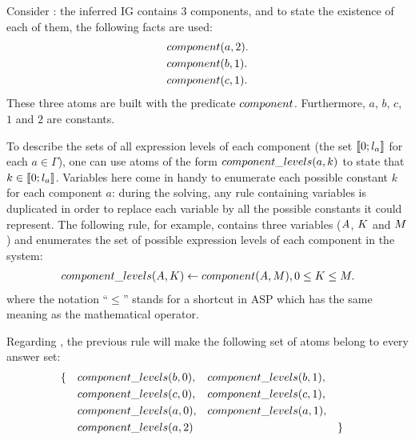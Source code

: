 \begin{example}
Consider : the inferred IG contains 3 components, and to state the existence of each of them, the following facts are used:
\begin{align*}
  &component(a, 2). \\
  &component(b, 1). \\
  &component(c, 1).
\end{align*}
These three atoms are built with the predicate $component$.
Furthermore, $a$, $b$, $c$, $1$ and $2$ are constants.
\end{example}

To describe the sets of all expression levels of each component (\ie the set $\llbracket 0 ; l_a \rrbracket$ for each $a \in \Gamma$),
one can use atoms of the form $component\_levels(a, k)$ to state that $k \in \llbracket 0 ; l_a \rrbracket$.
Variables here come in handy to enumerate each possible constant $k$ for each component $a$:
during the solving, any rule containing variables is duplicated in order to replace each variable by all the possible constants it could represent.
The following rule, for example, contains three variables ($A$, $K$ and $M$) and enumerates the set of possible expression levels of each component in the system:
\begin{align*}
  component\_levels(A, K) \leftarrow component(A, M), 0 \leq K \leq M.
\end{align*}
where the notation “$\leq$” stands for a shortcut in ASP which has the same meaning as the mathematical operator.

\begin{example}
Regarding , the previous rule will make the following set of atoms belong to every answer set:
\begin{align*}
  &\{&&component\_levels(b, 0),
  &&component\_levels(b, 1), \\
  &&&component\_levels(c, 0),
  &&component\_levels(c, 1), \\
  &&&component\_levels(a, 0),
  &&component\_levels(a, 1), \\
  &&&component\_levels(a, 2) &&&&\}
\end{align*}
\end{example}

